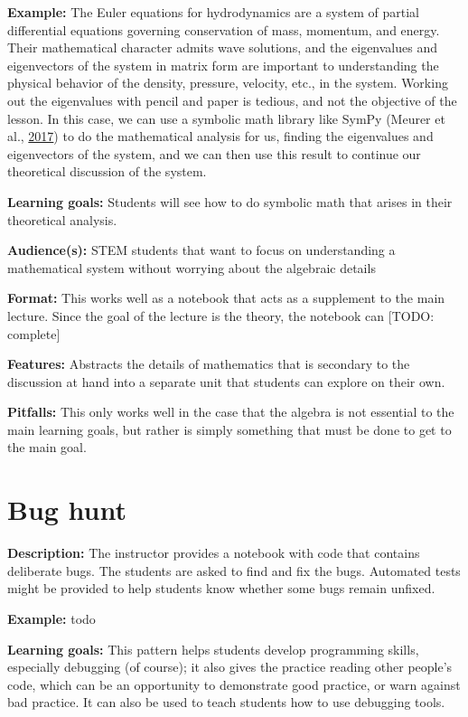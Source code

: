 \documentclass[]{book}
\begin{document}
\textbf{Example:} The Euler equations for hydrodynamics are a system of
partial differential equations governing conservation of mass, momentum,
and energy. Their mathematical character admits wave solutions, and the
eigenvalues and eigenvectors of the system in matrix form are important
to understanding the physical behavior of the density, pressure,
velocity, etc., in the system. Working out the eigenvalues with pencil
and paper is tedious, and not the objective of the lesson. In this case,
we can use a symbolic math library like SymPy (Meurer et al.,
\protect\hyperlink{ref-Meurer2017}{2017}) to do the mathematical
analysis for us, finding the eigenvalues and eigenvectors of the system,
and we can then use this result to continue our theoretical discussion
of the system.

\textbf{Learning goals:} Students will see how to do symbolic math that
arises in their theoretical analysis.

\textbf{Audience(s):} STEM students that want to focus on understanding
a mathematical system without worrying about the algebraic details

\textbf{Format:} This works well as a notebook that acts as a supplement
to the main lecture. Since the goal of the lecture is the theory, the
notebook can {[}TODO: complete{]}

\textbf{Features:} Abstracts the details of mathematics that is
secondary to the discussion at hand into a separate unit that students
can explore on their own.

\textbf{Pitfalls:} This only works well in the case that the algebra is
not essential to the main learning goals, but rather is simply something
that must be done to get to the main goal.

\section{Bug hunt}\label{bug-hunt}

\textbf{Description:} The instructor provides a notebook with code that
contains deliberate bugs. The students are asked to find and fix the
bugs. Automated tests might be provided to help students know whether
some bugs remain unfixed.

\textbf{Example:} todo

\textbf{Learning goals:} This pattern helps students develop programming
skills, especially debugging (of course); it also gives the practice
reading other people's code, which can be an opportunity to demonstrate
good practice, or warn against bad practice. It can also be used to
teach students how to use debugging tools.
\end{document}
